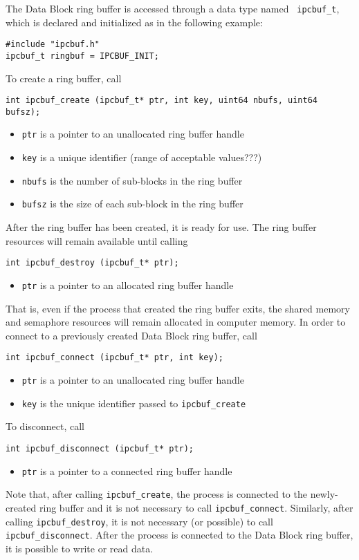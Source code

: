 The Data Block ring buffer is accessed through a data type named {\tt
ipcbuf\_t}, which is declared and initialized as in the following
example:
\begin{verbatim}
#include "ipcbuf.h"
ipcbuf_t ringbuf = IPCBUF_INIT;
\end{verbatim}
To create a ring buffer, call
\begin{verbatim}
int ipcbuf_create (ipcbuf_t* ptr, int key, uint64 nbufs, uint64 bufsz);
\end{verbatim}
\vspace{-3mm}
\begin{itemize}
\item {\tt ptr} is a pointer to an unallocated ring buffer handle
\item {\tt key} is a unique identifier (range of acceptable values???)
\item {\tt nbufs} is the number of sub-blocks in the ring buffer
\item {\tt bufsz} is the size of each sub-block in the ring buffer
\end{itemize}
After the ring buffer has been created, it is ready for use.   The ring
buffer resources will remain available until calling
\begin{verbatim}
int ipcbuf_destroy (ipcbuf_t* ptr);
\end{verbatim}
\vspace{-3mm}
\begin{itemize}
\item {\tt ptr} is a pointer to an allocated ring buffer handle
\end{itemize}
That is, even if the process that created the ring buffer exits, the
shared memory and semaphore resources will remain allocated in
computer memory.  In order to connect to a previously created Data
Block ring buffer, call
\begin{verbatim}
int ipcbuf_connect (ipcbuf_t* ptr, int key);
\end{verbatim}
\vspace{-3mm}
\begin{itemize}
\item {\tt ptr} is a pointer to an unallocated ring buffer handle
\item {\tt key} is the unique identifier passed to {\tt ipcbuf\_create}
\end{itemize}
To disconnect, call
\begin{verbatim}
int ipcbuf_disconnect (ipcbuf_t* ptr);
\end{verbatim}
\vspace{-3mm}
\begin{itemize}
\item {\tt ptr} is a pointer to a connected ring buffer handle
\end{itemize}
Note that, after calling {\tt ipcbuf\_create}, the process is connected
to the newly-created ring buffer and it is not necessary to call 
{\tt ipcbuf\_connect}.  Similarly, after calling {\tt ipcbuf\_destroy},
it is not necessary (or possible) to call {\tt ipcbuf\_disconnect}.
After the process is connected to the Data Block ring buffer, it is
possible to write or read data.

